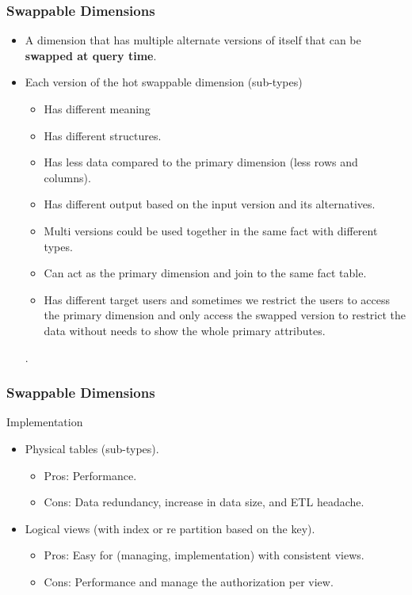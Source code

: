 \begin{frame}
\frametitle{Swappable Dimensions}
	\begin{itemize}[<+->]
		\item A dimension that has multiple alternate versions of itself that can be \textbf{swapped at query time}.
		\item Each version of the hot swappable dimension (sub-types)
			\begin{itemize}[<+->]
				\item Has different meaning
				\item Has different structures.
				\item Has less data compared to the primary dimension (less rows and columns).
				\item Has different output based on the input version and its alternatives.
				\item Multi versions could be used together in the same fact with different types.
				\item Can act as the primary dimension and join to the same fact table.
				\item Has different target users and sometimes we restrict the users to access the primary dimension and only access the swapped version to restrict the data without needs to show the whole primary attributes.

			\end{itemize}.
	\end{itemize}
	
\end{frame}
\begin{frame}
\frametitle{Swappable Dimensions}
\centering

\begin{block}{Implementation}
	\begin{itemize}
		\item Physical tables (sub-types).
		\begin{itemize}
			\item Pros: Performance.
			\item Cons: Data redundancy, increase in data size, and ETL headache.
		\end{itemize}
		\item Logical views (with index or re partition based on the key).%
		\begin{itemize}
			\item Pros: Easy for (managing, implementation) with consistent views.
			\item Cons: Performance and manage the authorization per view.
		\end{itemize}		
	\end{itemize}
\end{block}
\end{frame}
